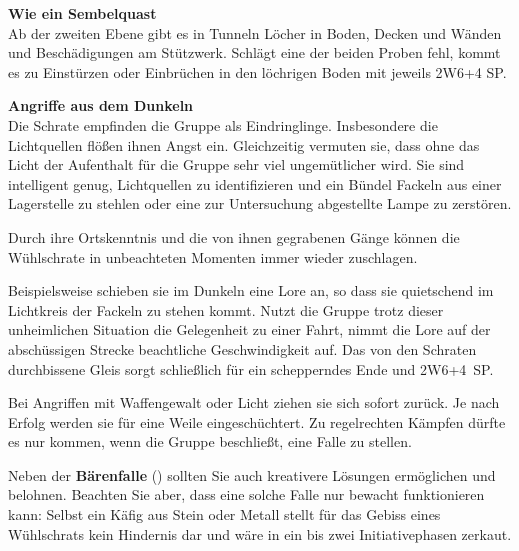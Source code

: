 \textbf{Wie ein Sembelquast}\\
Ab der zweiten Ebene gibt es in Tunneln Löcher in Boden, Decken und Wänden und Beschädigungen am Stützwerk.
Schlägt eine der beiden Proben fehl, kommt es zu Einstürzen oder Einbrüchen in den löchrigen Boden mit jeweils 2W6+4 SP.
\bigskip

\textbf{Angriffe aus dem Dunkeln}\\
Die Schrate empfinden die Gruppe als Eindringlinge.
Insbesondere die Lichtquellen flößen ihnen Angst ein.
Gleichzeitig vermuten sie, dass ohne das Licht der Aufenthalt für die Gruppe sehr viel ungemütlicher wird.
Sie sind intelligent genug, Lichtquellen zu identifizieren und ein Bündel Fackeln aus einer Lagerstelle zu stehlen oder eine zur Untersuchung abgestellte Lampe zu zerstören.

Durch ihre Ortskenntnis und die von ihnen gegrabenen Gänge können die Wühlschrate in unbeachteten Momenten immer wieder zuschlagen.


Beispielsweise schieben sie im Dunkeln eine Lore an, so dass sie quietschend im Lichtkreis der Fackeln zu stehen kommt.
Nutzt die Gruppe trotz dieser unheimlichen Situation die Gelegenheit zu einer Fahrt, nimmt die Lore auf der abschüssigen Strecke beachtliche Geschwindigkeit auf.
Das von den Schraten durchbissene Gleis sorgt schließlich für ein schepperndes Ende und 2W6+4~SP.

Bei Angriffen mit Waffengewalt oder Licht ziehen sie sich sofort zurück. Je nach Erfolg werden sie für eine Weile eingeschüchtert.
Zu regelrechten Kämpfen dürfte es nur kommen, wenn die Gruppe beschließt, eine Falle zu stellen.

Neben der \textbf{Bärenfalle} () sollten Sie auch kreativere Lösungen ermöglichen und belohnen.
Beachten Sie aber, dass eine solche Falle nur bewacht funktionieren kann:
Selbst ein Käfig aus Stein oder Metall stellt für das Gebiss eines Wühlschrats kein Hindernis dar und wäre in ein bis zwei Initiativephasen zerkaut.


